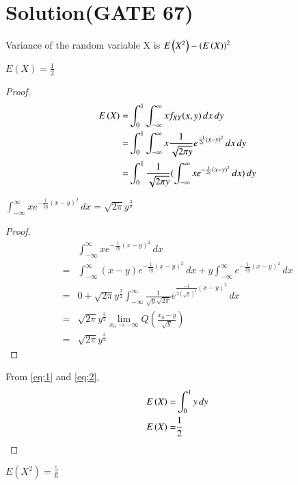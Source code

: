 \documentclass[journal,12pt,twocolumn]{IEEEtran}
\begin{document}
\section*{\textbf{Solution(GATE 67)}}
Variance of the random variable X is $E\left(X^2\right)-\left(E\left(X\right)\right)^2$\\
\begin{lemma}
$E(X) = \frac{1}{2}$
\end{lemma}
\begin{proof}
\begin{align}
 E\left(X\right)=&\int_{0}^{1}\int_{-\infty}^{\infty}x f_{XY}(x,y)\,dx\,dy\\
    =&\int_{0}^{1}\int_{-\infty}^{\infty}x\frac{1}{\sqrt{2\pi y}}e^{\frac{-1}{2y}(x-y)^2}\,dx \,dy\\
     =&\int_{0}^{1}\frac{1}{\sqrt{2\pi y}}(\int_{-\infty}^{\infty}xe^{-\frac{1}{2y}(x-y)^2}\,dx)\,dy \label{eq:1}
\end{align}



\begin{lemma}
$\int_{-\infty}^{\infty}xe^{-\frac{1}{2y}(x-y)^2}\,dx = \sqrt{2\pi}y^\frac{3}{2}$
\end{lemma}
\begin{proof}
\begin{align}
    &\int_{-\infty}^{\infty}xe^{-\frac{1}{2y}(x-y)^2}\,dx\\
  =&\int_{-\infty}^{\infty}(x-y)e^{-\frac{1}{2y}(x-y)^2}\,dx+y\int_{-\infty}^{\infty}e^{-\frac{1}{2y}(x-y)^2}\,dx\\
 =&0+\sqrt{2\pi}y^{\frac{3}{2}}\int_{-\infty}^{\infty}\frac{1}{\sqrt{y}\sqrt{2\pi}}e^{\frac{-1}{2(\sqrt{y})^2}(x-y)^2}\,dx\\
 =&\sqrt{2\pi}y^\frac{3}{2}\lim_{x_0 \to -\infty}Q(\frac{x_0 - y}{\sqrt{y}})\\
  =&\sqrt{2\pi}y^\frac{3}{2} \label{eq:2}
\end{align}
\end{proof}

From \eqref{eq:1} and \eqref{eq:2}, 
\begin{align}
E\left(X\right)=&\int_{0}^{1}y\,dy\\
E\left(X\right)=&\frac{1}{2} \label{eq:3}
\end{align}
\end{proof}
\begin{lemma}
$E(X^2) = \frac{5}{6}$
\end{lemma}
\end{document}
